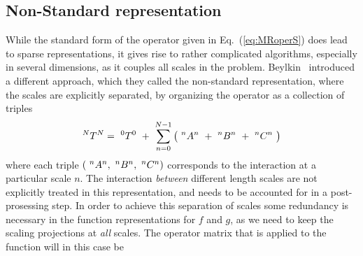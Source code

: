 \subsection{Non-Standard representation}
While the standard form of the operator given in Eq.~(\ref{eq:MRoperS}) does
lead to sparse representations, it gives rise to rather complicated algorithms,
especially in several dimensions, as it couples all scales in the problem. 
Beylkin~\etal \cite{Beylkin:1991} introduced a different approach, which they called
the non-standard representation, where the scales are explicitly separated, by
organizing the operator as a collection of triples
\begin{equation}
    \T{N}{N} =\ \T{0}{0}\ +\ \sum_{n=0}^{N-1} \big(\ \A{n}{n}\ +\ \B{n}{n}\ +\ \C{n}{n}\ \big) 
\end{equation}
where each triple $(\ \A{n}{n},\ \B{n}{n},\ \C{n}{n})$ corresponds to the interaction
at a particular scale $n$. The interaction \emph{between} different length scales are
not explicitly treated in this representation, and needs to be accounted for in
a post-prosessing step. In order to achieve this separation of scales some redundancy
is necessary in the function representations for $f$ and $g$, as we need to keep the 
scaling projections at \emph{all} scales. The operator matrix that is applied to the 
function will in this case be
